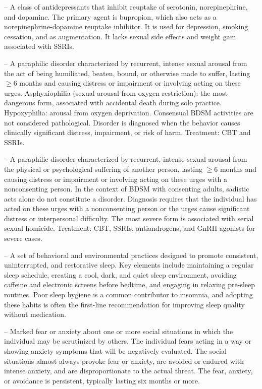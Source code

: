 -- A class of antidepressants that inhibit reuptake of serotonin, norepinephrine, and dopamine. The primary agent is bupropion, which also acts as a norepinephrine-dopamine reuptake inhibitor. It is used for depression, smoking cessation, and as augmentation. It lacks sexual side effects and weight gain associated with SSRIs.

-- A paraphilic disorder characterized by recurrent, intense sexual arousal from the act of being humiliated, beaten, bound, or otherwise made to suffer, lasting \(\ge\)6 months and causing distress or impairment or involving acting on these urges. Asphyxiophilia (sexual arousal from oxygen restriction): the most dangerous form, associated with accidental death during solo practice. Hypoxyphilia: arousal from oxygen deprivation. Consensual BDSM activities are not considered pathological. Disorder is diagnosed when the behavior causes clinically significant distress, impairment, or risk of harm. Treatment: CBT and SSRIs.

-- A paraphilic disorder characterized by recurrent, intense sexual arousal from the physical or psychological suffering of another person, lasting \(\ge\)6 months and causing distress or impairment or involving acting on these urges with a nonconsenting person. In the context of BDSM with consenting adults, sadistic acts alone do not constitute a disorder. Diagnosis requires that the individual has acted on these urges with a nonconsenting person or the urges cause significant distress or interpersonal difficulty. The most severe form is associated with serial sexual homicide. Treatment: CBT, SSRIs, antiandrogens, and GnRH agonists for severe cases.

-- A set of behavioral and environmental practices designed to promote consistent, uninterrupted, and restorative sleep. Key elements include maintaining a regular sleep schedule, creating a cool, dark, and quiet sleep environment, avoiding caffeine and electronic screens before bedtime, and engaging in relaxing pre-sleep routines. Poor sleep hygiene is a common contributor to insomnia, and adopting these habits is often the first-line recommendation for improving sleep quality without medication.

-- Marked fear or anxiety about one or more social situations in which the individual may be scrutinized by others. The individual fears acting in a way or showing anxiety symptoms that will be negatively evaluated. The social situations almost always provoke fear or anxiety, are avoided or endured with intense anxiety, and are disproportionate to the actual threat. The fear, anxiety, or avoidance is persistent, typically lasting six months or more.



